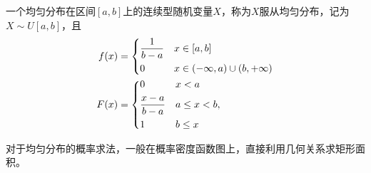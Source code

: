 \begin{definition}
    一个均匀分布在区间$[a,b]$上的连续型随机变量$X$，称为$X$服从均匀分布，记为$X\sim U[a,b]$，且
    \begin{align*}
        f(x) & =
        \begin{dcases}
            \frac{1}{b-a} & x \in [a,b]                     \\
            0             & x \in(-\infty,a)\cup(b,+\infty)
        \end{dcases} \\
        F(x) & =
        \begin{dcases}
            0               & x<a          \\
            \frac{x-a}{b-a} & a\leq x < b, \\
            1               & b\leq x
        \end{dcases}
    \end{align*}
\end{definition}

对于均匀分布的概率求法，一般在概率密度函数图上，直接利用几何关系求矩形面积。

